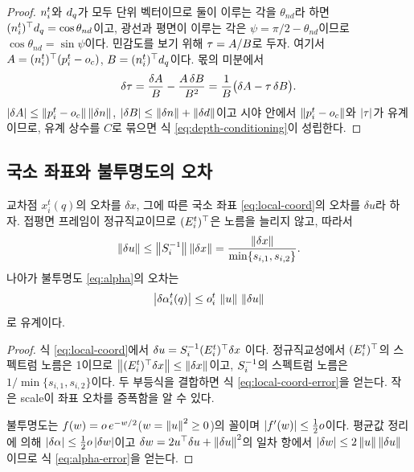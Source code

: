 \begin{proof}
$n^t_i$와 $d_q$가 모두 단위 벡터이므로 둘이 이루는 각을 $\theta_{nd}$라 하면
$(n^t_i)^{\top}d_q = \cos\theta_{nd}$이고, 광선과 평면이 이루는 각은
$\psi = \pi/2-\theta_{nd}$이므로 $\cos\theta_{nd}=\sin\psi$이다. 민감도를 보기 위해
$\tau = A/B$로 두자. 여기서 $A = (n^t_i)^{\top}(p^t_i-o_c)$,
$B = (n^t_i)^{\top}d_q$이다. 몫의 미분에서
\[
  \delta\tau = \frac{\delta A}{B} - \frac{A\,\delta B}{B^2}
  = \frac{1}{B}\bigl(\delta A - \tau\,\delta B\bigr).
\]
$\left\lvert \delta A \right\rvert \le \left\lVert p^t_i-o_c \right\rVert\left\lVert \delta n \right\rVert$,
$\left\lvert \delta B \right\rvert \le \left\lVert \delta n \right\rVert+\left\lVert \delta d \right\rVert$이고 시야 안에서
$\left\lVert p^t_i-o_c \right\rVert$와 $\left\lvert \tau \right\rvert$가 유계이므로, 유계 상수를 $C$로 묶으면
식 \eqref{eq:depth-conditioning}이 성립한다.
\end{proof}

\subsection{국소 좌표와 불투명도의 오차}

\begin{proposition}
\label{prop:local-coord}
교차점 $x^t_i(q)$의 오차를 $\delta x$, 그에 따른 국소 좌표 \eqref{eq:local-coord}의
오차를 $\delta u$라 하자. 접평면 프레임이 정규직교이므로 $(E^t_i)^{\top}$은
노름을 늘리지 않고, 따라서
\begin{equation}
  \left\lVert \delta u \right\rVert \le \left\lVert S_i^{-1} \right\rVert\left\lVert \delta x \right\rVert
  = \frac{\left\lVert \delta x \right\rVert}{\min\{s_{i,1},s_{i,2}\}}.
  \label{eq:local-coord-error}
\end{equation}
나아가 불투명도 \eqref{eq:alpha}의 오차는
\begin{equation}
  \left\lvert \delta \alpha^t_i(q) \right\rvert \le o^t_i\,\left\lVert u \right\rVert\,\left\lVert \delta u \right\rVert
  \label{eq:alpha-error}
\end{equation}
로 유계이다.
\end{proposition}

\begin{proof}
식 \eqref{eq:local-coord}에서 $\delta u = S_i^{-1}(E^t_i)^{\top}\delta x$
이다. 정규직교성에서 $(E^t_i)^{\top}$의 스펙트럼 노름은 1이므로
$\left\lVert (E^t_i)^{\top} \delta x \right\rVert\le\left\lVert \delta x \right\rVert$이고,
$S_i^{-1}$의 스펙트럼 노름은 $1/\min\{s_{i,1},s_{i,2}\}$이다. 두 부등식을
결합하면 식 \eqref{eq:local-coord-error}을 얻는다. 작은 scale이 좌표 오차를 증폭함을
알 수 있다.

불투명도는 $f(w) = o\,e^{-w/2}$($w=\left\lVert u \right\rVert^2\ge0$)의 꼴이며
$\left\lvert f'(w) \right\rvert\le\tfrac12o$이다. 평균값 정리에 의해
$\left\lvert \delta\alpha \right\rvert\le\tfrac12o\left\lvert \delta w \right\rvert$이고
$\delta w = 2u^{\top}\delta u + \left\lVert \delta u \right\rVert^2$의 일차 항에서
$\left\lvert \delta w \right\rvert\le2\left\lVert u \right\rVert\left\lVert \delta u \right\rVert$이므로 식 \eqref{eq:alpha-error}을 얻는다.
\end{proof}

